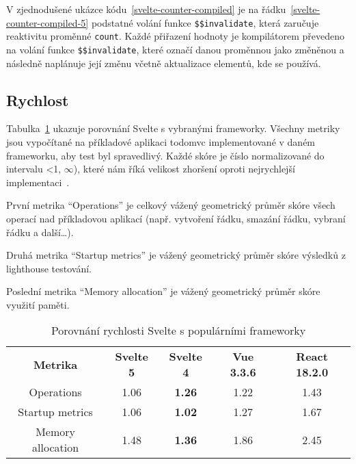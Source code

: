 V zjednodušené ukázce kódu~\ref{svelte-counter-compiled} je na řádku~\ref{svelte-counter-compiled-5} podstatné volání funkce \texttt{\$\$invalidate}, která zaručuje reaktivitu proměnné \texttt{count}.
Každé přiřazení hodnoty je kompilátorem převedeno na volání funkce \texttt{\$\$invalidate}, které označí danou proměnnou jako změněnou a následně naplánuje její změnu včetně aktualizace elementů, kde se používá.

\subsection{Rychlost}

Tabulka~\ref{tab:technology1} ukazuje porovnání Svelte s vybranými frameworky.
Všechny metriky jsou vypočítané na příkladové aplikaci \gls{todomvc} implementované v daném frameworku, aby test byl spravedlivý.
Každé skóre je číslo normalizované do intervalu <1, $\infty$), které nám říká velikost zhoršení oproti nejrychlejší implementaci~\cite{krausest119,krausest120}.

První metrika ``Operations'' je celkový vážený geometrický průměr skóre všech operací nad příkladovou aplikací (např. vytvoření řádku, smazání řádku, vybraní řádku a další\dots).

Druhá metrika ``Startup metrics'' je vážený geometrický průměr skóre výsledků z \gls{lighthouse} testování.

Poslední metrika ``Memory allocation'' je vážený geometrický průměr skóre využití paměti.


\begin{table}[ht]
    \begin{ctucolortab}
        \begin{tabular}{c c c c c}
            \bfseries Metrika & \bfseries{Svelte 5} & \bfseries{Svelte 4} & \bfseries{Vue 3.3.6} & \bfseries{React 18.2.0} \\\Midrule{}
            Operations        & 1.06                & \textbf{1.26}       & 1.22                 & 1.43                    \\
            Startup metrics   & 1.06                & \textbf{1.02}       & 1.27                 & 1.67                    \\
            Memory allocation & 1.48                & \textbf{1.36}       & 1.86                 & 2.45
        \end{tabular}
    \end{ctucolortab}
    \caption{Porovnání rychlosti Svelte s populárními frameworky}
    \label{tab:technology1}
\end{table}

